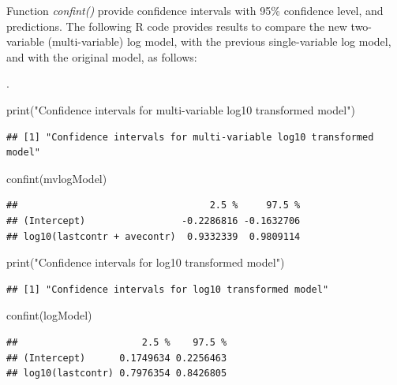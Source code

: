 \documentclass[
]{article}
\newenvironment{Shaded}{\begin{snugshade}}{\end{snugshade}}
\newcommand{\FunctionTok}[1]{\textcolor[rgb]{0.00,0.00,0.00}{#1}}
\newcommand{\NormalTok}[1]{#1}
\newcommand{\StringTok}[1]{\textcolor[rgb]{0.31,0.60,0.02}{#1}}
\begin{document}
Function \emph{confint()} provide confidence intervals with 95\%
confidence level, and predictions. The following R code provides results
to compare the new two-variable (multi-variable) log model, with the
previous single-variable log model, and with the original model, as
follows:

.

\begin{Shaded}
\begin{Highlighting}[]
\FunctionTok{print}\NormalTok{(}\StringTok{"Confidence intervals for multi{-}variable log10 transformed model"}\NormalTok{)}
\end{Highlighting}
\end{Shaded}

\begin{verbatim}
## [1] "Confidence intervals for multi-variable log10 transformed model"
\end{verbatim}

\begin{Shaded}
\begin{Highlighting}[]
\FunctionTok{confint}\NormalTok{(mvlogModel)}
\end{Highlighting}
\end{Shaded}

\begin{verbatim}
##                                  2.5 %     97.5 %
## (Intercept)                 -0.2286816 -0.1632706
## log10(lastcontr + avecontr)  0.9332339  0.9809114
\end{verbatim}

\begin{Shaded}
\begin{Highlighting}[]
\FunctionTok{print}\NormalTok{(}\StringTok{"Confidence intervals for log10 transformed model"}\NormalTok{)}
\end{Highlighting}
\end{Shaded}

\begin{verbatim}
## [1] "Confidence intervals for log10 transformed model"
\end{verbatim}

\begin{Shaded}
\begin{Highlighting}[]
\FunctionTok{confint}\NormalTok{(logModel)}
\end{Highlighting}
\end{Shaded}

\begin{verbatim}
##                      2.5 %    97.5 %
## (Intercept)      0.1749634 0.2256463
## log10(lastcontr) 0.7976354 0.8426805
\end{verbatim}
\end{document}
